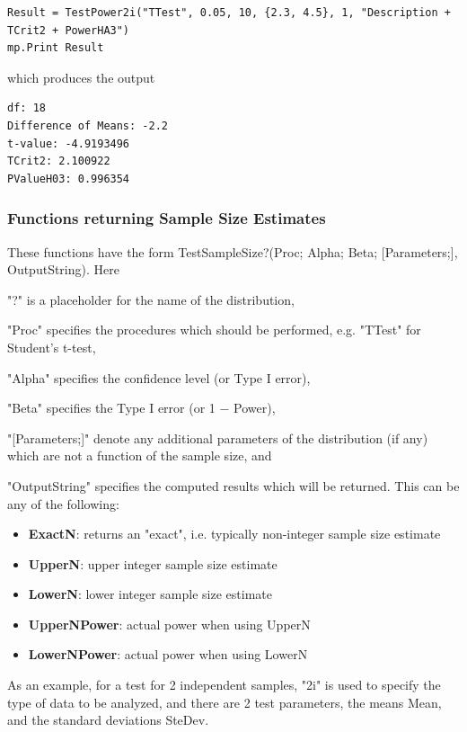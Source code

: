 \begin{lstlisting}
Result = TestPower2i("TTest", 0.05, 10, {2.3, 4.5}, 1, "Description + TCrit2 + PowerHA3")
mp.Print Result
\end{lstlisting}
which produces the output

\begin{verbatim}
df: 18
Difference of Means: -2.2
t-value: -4.9193496
TCrit2: 2.100922
PValueH03: 0.996354
\end{verbatim}








\newpage
\subsubsection{Functions returning Sample Size Estimates}
These functions have the form \textsf{TestSampleSize?(Proc; Alpha; Beta; [Parameters;],  OutputString)}.
Here 

"?" is a placeholder for the name of the distribution, 

"Proc" specifies the procedures which should be performed, e.g. "TTest" for Student's t-test, 

"Alpha" specifies the confidence level (or Type I error), 

"Beta" specifies the Type I error (or 1 $-$ Power), 

"[Parameters;]" denote any additional parameters of the distribution (if any) which are not a function of the sample size, and 

"OutputString" specifies the computed results which will be returned. This can be any of the following:

\begin{itemize}
	\item \textbf{ExactN}: returns an "exact", i.e. typically non-integer sample size estimate 
	\item \textbf{UpperN}: upper integer sample size estimate
	\item \textbf{LowerN}: lower integer sample size estimate
	\item \textbf{UpperNPower}: actual power when using UpperN
	\item \textbf{LowerNPower}: actual power when using LowerN
\end{itemize}


\vspace{0.3cm}
As an example, for a test for 2 independent samples, "2i" is used to specify the type of data to be analyzed,  and there are 2 test parameters, the means  \textsf{Mean}, and the standard deviations \textsf{SteDev}.

